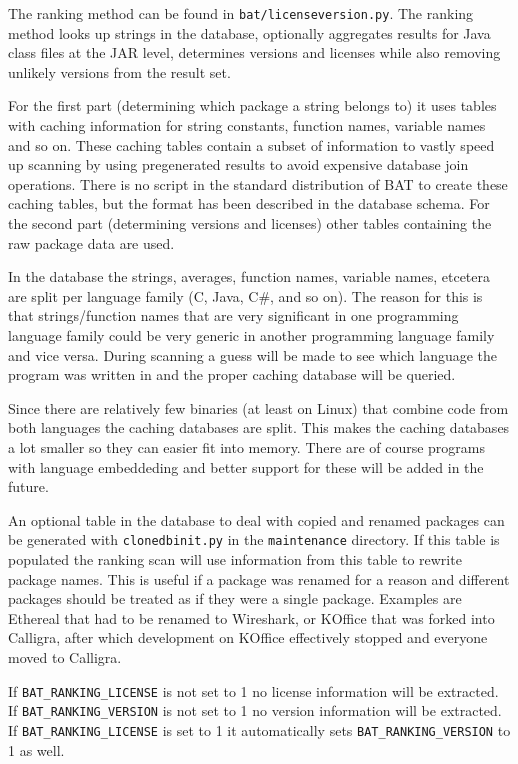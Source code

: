 \documentclass[10pt,a4paper]{article}
\begin{document}
The ranking method can be found in \texttt{bat/licenseversion.py}. The ranking
method looks up strings in the database, optionally aggregates results for
Java class files at the JAR level, determines versions and licenses while also
removing unlikely versions from the result set.

For the first part (determining which package a string belongs to) it uses
tables with caching information for string constants, function names, variable
names and so on. These caching tables contain a subset of information to vastly
speed up scanning by using pregenerated results to avoid expensive database
join operations. There is no script in the standard distribution of BAT to
create these caching tables, but the format has been described in the database
schema. For the second part (determining versions and licenses) other tables
containing the raw package data are used.

In the database the strings, averages, function names, variable names, etcetera
are split per language family (C, Java, C\#, and so on). The reason for this is
that strings/function names that are very significant in one programming
language family could be very generic in another programming language family
and vice versa. During scanning a guess will be made to see which language the
program was written in and the proper caching database will be queried.

Since there are relatively few binaries (at least on Linux) that combine
code from both languages the caching databases are split. This makes the
caching databases a lot smaller so they can easier fit into memory. There are
of course programs with language embeddeding and better support for these will
be added in the future.

An optional table in the database to deal with copied and renamed packages can
be generated with  \texttt{clonedbinit.py} in the \texttt{maintenance}
directory. If this table is populated the ranking scan will use information
from this table to rewrite package names. This is useful if a package was
renamed for a reason and different packages should be treated as if they were
a single package. Examples are Ethereal that had to be renamed to Wireshark,
or KOffice that was forked into Calligra, after which development on KOffice
effectively stopped and everyone moved to Calligra.

If \texttt{BAT\_RANKING\_LICENSE} is not set to 1 no license information will
be extracted. If \texttt{BAT\_RANKING\_VERSION} is not set to 1 no version
information will be extracted. If \texttt{BAT\_RANKING\_LICENSE} is set to 1 it
automatically sets \texttt{BAT\_RANKING\_VERSION} to 1 as well.
\end{document}
